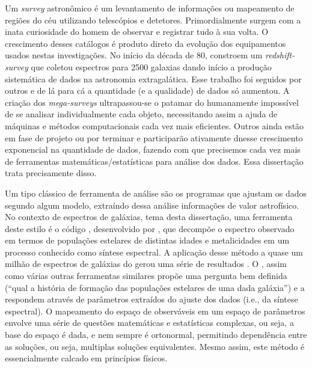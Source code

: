 Um {\em survey} astronômico é um levantamento de informações ou mapeamento de regiões do céu utilizando telescópios e
detetores. Primordialmente surgem com a inata curiosidade do homem de observar e registrar tudo à sua volta. O
crescimento desses catálogos é produto direto da evolução dos equipamentos usados nestas investigações. No início da
década de 80, \citet{Huchra1983} constroem um {\em redshift-survey} que coletou espectros para 2500 galaxias dando
início a produção sistemática de dados na astronomia extragalática. Esse trabalho foi seguidos por outros \citep[e.g.,
][]{Huchra1988, DaCosta1988} e de lá para cá a quantidade (e a qualidade) de dados só aumentou. A criação dos {\em
mega-surveys} \citep[e.g., \SDSS, 2dFGRS, 2MASS; ][]{York2000, Colless1999, Skrutskie2006} ultrapassou-se o patamar
do humanamente impossível de se analisar individualmente cada objeto, necessitando assim a ajuda de máquinas e métodos
computacionais cada vez mais eficientes. Outros ainda estão em fase de projeto \citep[LSST; ][]{Ivezic2008} ou por
terminar \citep[JPAS; ][]{Benitez2009} e participarão ativamente dnesse crescimento exponencial na quantidade de dados,
fazendo com que precisemos cada vez mais de ferramentas matemáticas/estatísticas para análise dos dados. Essa
dissertação trata precisamente disso.

Um tipo clássico de ferramenta de análise são os programas que ajustam os dados segundo algum modelo, extraíndo dessa
análise informações de valor astrofísico. No contexto de espectros de galáxias, tema desta dissertação, uma ferramenta
deste estilo é o código \starlight, desenvolvido por \citet{CidFernandes2005}, que decompõe o espectro observado em
termos de populações estelares de distintas idades e metalicidades em um processo conhecido como síntese espectral.
A aplicação desse método a quase um milhão de espectros de galáxias do \SDSS gerou uma série de resultados \citep[e.g.,
][]{Asari2007, Asari2009, CidFernandes2007, Mateus2007}. O \starlight, assim como várias outras ferramentas similares
\citep{Panter2003, Gallazzi2005, Ocvirk2006} propõe uma pergunta bem definida (``qual a história de formação das
populações estelares de uma dada galáxia'') e a respondem através de parâmetros extraídos do ajuste dos dados (i.e., da
síntese espectral). O mapeamento do espaço de observáveis em um espaço de parâmetros envolve uma série de questões
matemáticas e estatísticas complexas, ou seja, a base do espaço é dada, e nem sempre é ortonormal, permitindo
dependência entre as soluções, ou seja, multiplas soluções equivalentes. Mesmo assim, este método é essencialmente
calcado em princípios físicos.

